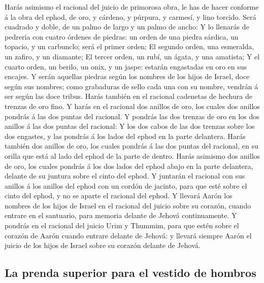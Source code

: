  Harás asimismo el racional del juicio de primorosa obra,
le has de hacer conforme á la obra del ephod, de oro, y cárdeno, y
púrpura, y carmesí, y lino torcido.  Será cuadrado y doble,
de un palmo de largo y un palmo de ancho:  Y lo llenarás de
pedrería con cuatro órdenes de piedras: un orden de una piedra sárdica,
un topacio, y un carbunclo; será el primer orden;  El
segundo orden, una esmeralda, un zafiro, y un diamante;  El
tercer orden, un rubí, un ágata, y una amatista;  Y el
cuarto orden, un berilo, un onix, y un jaspe: estarán engastadas en oro
en sus encajes.  Y serán aquellas piedras según los nombres
de los hijos de Israel, doce según sus nombres; como grabaduras de sello
cada una con su nombre, vendrán á ser según las doce tribus.
 Harás también en el racional cadenetas de hechura de
trenzas de oro fino.  Y harás en el racional dos anillos de
oro, los cuales dos anillos pondrás á las dos puntas del racional.
 Y pondrás las dos trenzas de oro en los dos anillos á las
dos puntas del racional:  Y los dos cabos de las dos
trenzas sobre los dos engastes, y las pondrás á los lados del ephod en
la parte delantera.  Harás también dos anillos de oro, los
cuales pondrás á las dos puntas del racional, en su orilla que está al
lado del ephod de la parte de dentro.  Harás asimismo dos
anillos de oro, los cuales pondrás á los dos lados del ephod abajo en la
parte delantera, delante de su juntura sobre el cinto del ephod.
 Y juntarán el racional con sus anillos á los anillos del
ephod con un cordón de jacinto, para que esté sobre el cinto del ephod,
y no se aparte el racional del ephod.  Y llevará Aarón los
nombres de los hijos de Israel en el racional del juicio sobre su
corazón, cuando entrare en el santuario, para memoria delante de Jehová
continuamente.  Y pondrás en el racional del juicio Urim y
Thummim, para que estén sobre el corazón de Aarón cuando entrare delante
de Jehová: y llevará siempre Aarón el juicio de los hijos de Israel
sobre su corazón delante de Jehová.

\hypertarget{la-prenda-superior-para-el-vestido-de-hombros}{%
\subsection{La prenda superior para el vestido de
hombros}\label{la-prenda-superior-para-el-vestido-de-hombros}}

